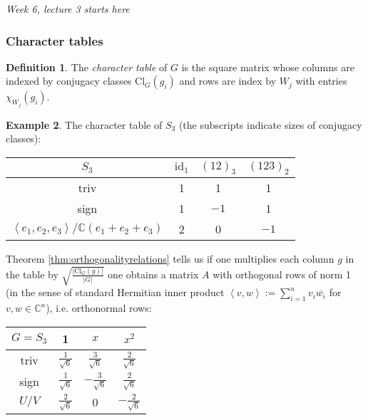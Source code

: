 \documentclass{article}
\newcommand{\la}{\left\langle}
\newcommand{\ra}{\right\rangle}
\newcommand{\C}{\mathbb{C}}
\newcommand{\Cl}{\text{Cl}}
\newcommand{\id}{\text{id}}
\theoremstyle{definition}
\newtheorem{defn}{Definition}[subsection]
\newtheorem{example}[defn]{Example}
\begin{document}
\begin{flushright}
\textit{Week 6, lecture 3 starts here}
\end{flushright}

\subsubsection{Character tables}
\begin{defn}
The \textit{character table} of $G$ is the square matrix whose columns are indexed by conjugacy classes $\Cl_G(g_i)$ and rows are index by $W_j$ with entries $\chi_{W_j}(g_i)$.
\end{defn}
\begin{example}
The character table of $S_3$ (the subscripts indicate sizes of conjugacy classes):
\begin{table}[H]
\centering
\begin{tabular}{c|ccc}
$S_3$                              & $\id_1$ & $(12)_3$  & $(123)_2$ \\ \hline
triv                                 & 1 & 1    & 1     \\
sign                                 & 1 & $-1$ & 1     \\
$\la e_1,e_2,e_3\ra/\C(e_1+e_2+e_3)$ & 2 & 0    & $-1$ 
\end{tabular}
\end{table}

Theorem \ref{thm:orthogonalityrelations} tells us if one multiplies each column $g$ in the table by $\sqrt{\frac{|\Cl_G(g)|}{|G|}}$ one obtains a matrix $A$ with orthogonal rows of norm 1 (in the sense of standard Hermitian inner product $\la v,w\ra:=\sum_{i=1}^n v_i\overline{w_i}$ for $v,w\in\C^n$), i.e. orthonormal rows:

\begin{table}[H]
\centering
\begin{tabular}{c|ccc}
$G=S_3$                              & 1                   & $x$                  & $x^2$                \\ \hline
triv                                 & $\frac{1}{\sqrt 6}$ & $\frac{3}{\sqrt 6}$  & $\frac{2}{\sqrt 6}$  \\
sign                                 & $\frac{1}{\sqrt 6}$ & $-\frac{3}{\sqrt 6}$ & $\frac{2}{\sqrt 6}$  \\
$U/V$ & $\frac{2}{\sqrt 6}$ & 0                    & $-\frac{2}{\sqrt 6}$
\end{tabular}
\end{table}
\end{example}
\end{document}
